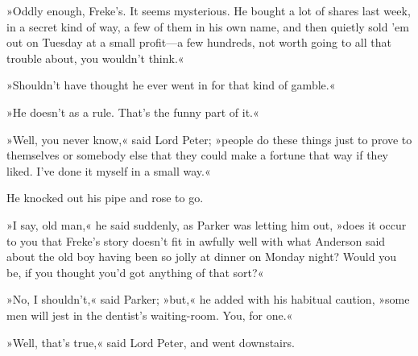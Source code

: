 »Oddly enough, Freke's. It seems mysterious. He bought a lot of shares last week, in a secret kind of way, a few of them in his own name, and then quietly sold 'em out on Tuesday at a small profit—a few hundreds, not worth going to all that trouble about, you wouldn't think.«

»Shouldn't have thought he ever went in for that kind of gamble.«

»He doesn't as a rule. That's the funny part of it.«

»Well, you never know,« said Lord Peter; »people do these things just to prove to themselves or somebody else that they could make a fortune that way if they liked. I've done it myself in a small way.«

He knocked out his pipe and rose to go.

»I say, old man,« he said suddenly, as Parker was letting him out, »does it occur to you that Freke's story doesn't fit in awfully well with what Anderson said about the old boy having been so jolly at dinner on Monday night? Would you be, if you thought you'd got anything of that sort?«

»No, I shouldn't,« said Parker; »but,« he added with his habitual caution, »some men will jest in the dentist's waiting-room. You, for one.«

»Well, that's true,« said Lord Peter, and went downstairs.
